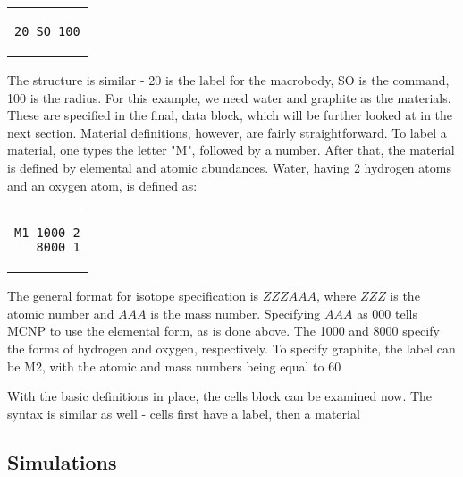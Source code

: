 \begin{center}
\begin{tabular}{c}
\begin{lstlisting}
20 SO 100
\end{lstlisting}
\end{tabular}
\end{center}
The structure is similar - 20 is the label for the macrobody, SO is the command, 100 is the radius. For this example, we need water and graphite as the materials. These are specified in the final, data block, which will be further looked at in the next section. Material definitions, however, are fairly straightforward. To label a material, one types the letter "M", followed by a number. After that, the material is defined by elemental and atomic abundances. Water, having 2 hydrogen atoms and an oxygen atom, is defined as:
\begin{center}
\begin{tabular}{c}
\begin{lstlisting}
M1 1000 2
   8000 1
\end{lstlisting}
\end{tabular}
\end{center}
The general format for isotope specification is $ZZZAAA$, where $ZZZ$ is the atomic number and $AAA$ is the mass number. Specifying $AAA$ as 000 tells MCNP to use the elemental form, as is done above. The 1000 and 8000 specify the forms of hydrogen and oxygen, respectively. To specify graphite, the label can be M2, with the atomic and mass numbers being equal to 60

With the basic definitions in place, the cells block can be examined now. The syntax is similar as well - cells first have a label, then a material 
\label{sec:simulations}
\subsection{Simulations}




